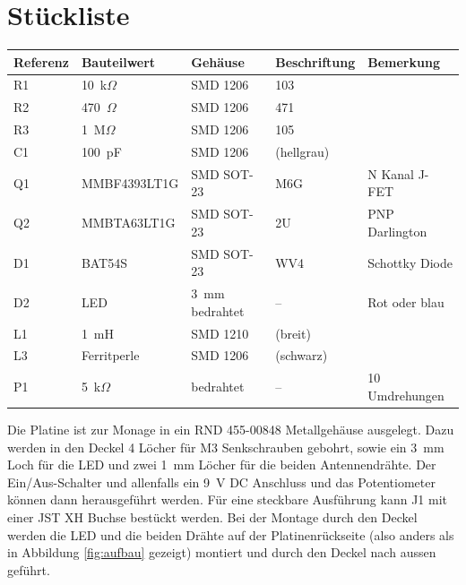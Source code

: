 \documentclass[a4paper,11pt,halfparskip,smallheadings,DIV=10]{scrartcl}
\begin{document}
\section{Stückliste}

\begin{center}\begin{tabular}{lllll}\toprule
    \textbf{Referenz} & \textbf{Bauteilwert} & \textbf{Gehäuse} & \textbf{Beschriftung} & \textbf{Bemerkung}\\\midrule
R1 & 10~k$\Omega$ & SMD 1206 & 103 & \\
R2 & 470~$\Omega$ & SMD 1206 & 471 & \\
R3 & 1~M$\Omega$  & SMD 1206 & 105 & \\
C1 & 100~pF       & SMD 1206 & (hellgrau) & \\
Q1 & MMBF4393LT1G & SMD SOT-23 & M6G & N Kanal J-FET\\ %
Q2 & MMBTA63LT1G  & SMD SOT-23 & 2U & PNP Darlington\\ 
D1 & BAT54S       & SMD SOT-23 & WV4 & Schottky Diode\\ %
D2 & LED          & 3~mm bedrahtet & -- & Rot oder blau\\
L1 & 1~mH         & SMD 1210   & (breit) & \\
L3 & Ferritperle  & SMD 1206   & (schwarz) & \\
P1 & 5~k$\Omega$  & bedrahtet  & -- & 10 Umdrehungen\\\bottomrule
\end{tabular}\end{center}

Die Platine ist zur Monage in ein RND 455-00848 Metallgehäuse ausgelegt. Dazu
werden in den Deckel 4 Löcher für M3 Senkschrauben gebohrt, sowie ein 3~mm
Loch für die LED und zwei 1~mm Löcher für die beiden Antennendrähte. Der
Ein/Aus-Schalter und allenfalls ein 9~V DC Anschluss und das Potentiometer
können dann herausgeführt werden. Für eine steckbare Ausführung kann J1
mit einer JST XH Buchse bestückt werden. Bei der Montage durch den Deckel
werden die LED und die beiden Drähte auf der Platinenrückseite (also anders
als in Abbildung \ref{fig:aufbau} gezeigt) montiert und durch den Deckel
nach aussen geführt.
\end{document}
